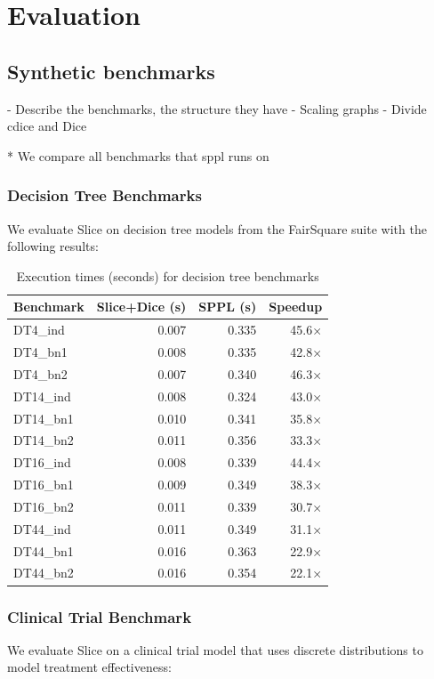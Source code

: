 \section{Evaluation}\label{sec:evaluation}


\subsection{Synthetic benchmarks}\label{sec:synthetic-benchmarks}
- Describe the benchmarks, the structure they have
- Scaling graphs
- Divide cdice and Dice

* We compare all benchmarks that sppl runs on

\subsubsection{Decision Tree Benchmarks}
We evaluate Slice on decision tree models from the FairSquare suite with the following results:

\begin{table}[!t]
\centering
\caption{Execution times (seconds) for decision tree benchmarks}
\begin{tabular}{lrrr}
\toprule
Benchmark & Slice+Dice (s) & SPPL (s) & Speedup \\
\midrule
DT4\_ind & 0.007 & 0.335 & 45.6× \\
DT4\_bn1 & 0.008 & 0.335 & 42.8× \\
DT4\_bn2 & 0.007 & 0.340 & 46.3× \\
DT14\_ind & 0.008 & 0.324 & 43.0× \\
DT14\_bn1 & 0.010 & 0.341 & 35.8× \\
DT14\_bn2 & 0.011 & 0.356 & 33.3× \\
DT16\_ind & 0.008 & 0.339 & 44.4× \\
DT16\_bn1 & 0.009 & 0.349 & 38.3× \\
DT16\_bn2 & 0.011 & 0.339 & 30.7× \\
DT44\_ind & 0.011 & 0.349 & 31.1× \\
DT44\_bn1 & 0.016 & 0.363 & 22.9× \\
DT44\_bn2 & 0.016 & 0.354 & 22.1× \\
\bottomrule
\end{tabular}
\end{table}

\subsubsection{Clinical Trial Benchmark}
We evaluate Slice on a clinical trial model that uses discrete distributions to model treatment effectiveness:


